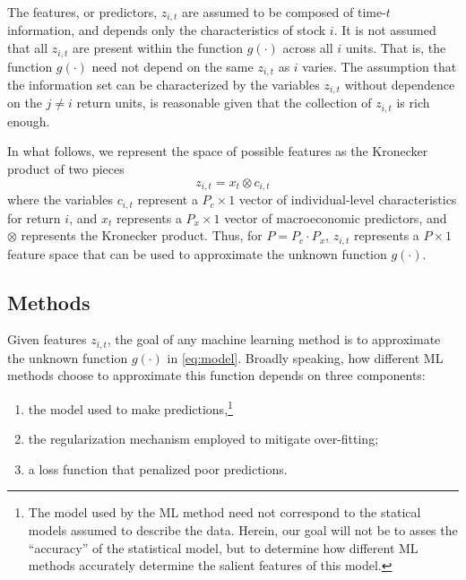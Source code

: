 \documentclass{article}
\begin{document}
The features, or predictors, $z_{i,t}$ are assumed to be composed of time-$t$ information, and depends only the characteristics of stock $i$. It is not assumed that all $z_{i,t}$ are present within the function $g(\cdot)$ across all $i$ units. That is, the function $g(\cdot)$ need not depend on the same $z_{i,t}$ as $i$ varies. The assumption that the information set can be characterized by the variables $z_{i,t}$ without dependence on the $j\neq i$ return units, is reasonable given that the collection of $z_{i,t}$ is rich enough. 

In what follows, we represent  the space of possible features as the Kronecker product of two pieces
\begin{equation}
\label{kronecker_equation}
z_{i,t} = x_t \otimes c_{i,t}
\end{equation}where the variables \( c_{i,t} \) represent a \( P_c \times 1 \) vector of individual-level characteristics for return \(i\), and \(x_t\) represents a $P_x \times 1$ vector of macroeconomic predictors, and $\otimes$ represents the Kronecker product. Thus, for $P = P_c\cdot P_x$, $z_{i,t}$ represents a $P \times 1$ feature space that can be used to approximate the unknown function $g(\cdot)$.

\subsection{Methods}Given features $z_{i,t}$, the goal of any machine learning method is to approximate the unknown function $g(\cdot)$ in \ref{eq:model}.  Broadly speaking, how different ML methods choose to approximate this function depends on three components:
\begin{enumerate}
	\item the model used to make predictions,\footnote{The model used by the ML method need not correspond to the statical models assumed to describe the data. Herein, our goal will not be to asses the ``accuracy'' of the statistical model, but to determine how different ML methods accurately determine the salient features of this model. }
	\item the regularization mechanism employed to mitigate over-fitting; 
	\item a loss function that penalized poor predictions. 
\end{enumerate}

\end{document}
